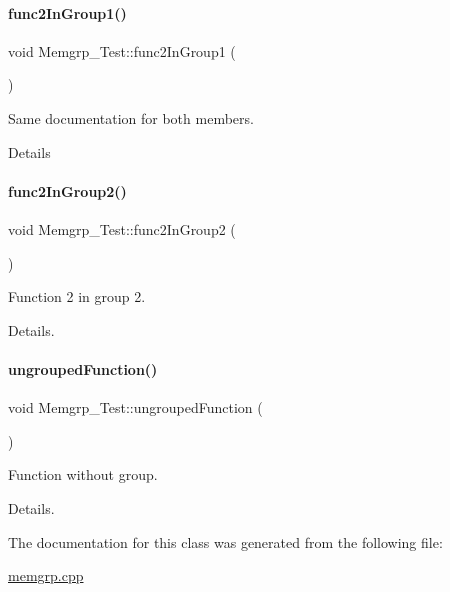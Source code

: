 \paragraph{\texorpdfstring{func2\+In\+Group1()}{func2InGroup1()}}
{\footnotesize\ttfamily void Memgrp\+\_\+\+Test\+::func2\+In\+Group1 (\begin{DoxyParamCaption}{ }\end{DoxyParamCaption})}



Same documentation for both members. 

Details \mbox{\label{class_memgrp___test_a9ce862049bb543596343e81ad3ddddff}} 
\paragraph{\texorpdfstring{func2\+In\+Group2()}{func2InGroup2()}}
{\footnotesize\ttfamily void Memgrp\+\_\+\+Test\+::func2\+In\+Group2 (\begin{DoxyParamCaption}{ }\end{DoxyParamCaption})\hspace{0.3cm}{\ttfamily [protected]}}



Function 2 in group 2. 

Details. \mbox{\label{class_memgrp___test_a8a3a4ac34b2e25696159ac420bd4bdc6}} 
\paragraph{\texorpdfstring{ungrouped\+Function()}{ungroupedFunction()}}
{\footnotesize\ttfamily void Memgrp\+\_\+\+Test\+::ungrouped\+Function (\begin{DoxyParamCaption}{ }\end{DoxyParamCaption})}



Function without group. 

Details. 

The documentation for this class was generated from the following file\+:\begin{DoxyCompactItemize}
\item 
\hyperlink{memgrp_8cpp}{memgrp.\+cpp}\end{DoxyCompactItemize}
